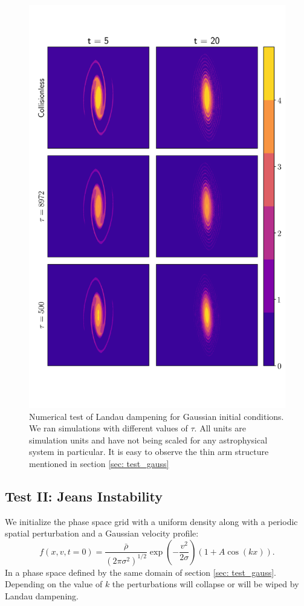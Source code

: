 \documentclass[fleqn,usenatbib]{mnras}
\begin{document}
\begin{figure}
    \centering
    \includegraphics[scale=0.8]{images/gauss.png} %
    \caption{Numerical test of Landau dampening for Gaussian initial conditions. We ran simulations with different values of $\tau$. All units are simulation units and have not being scaled for any astrophysical system in particular. It is easy to observe the thin arm structure mentioned in section \ref{sec: test_gauss}}
    \label{fig: Gauss_test}
\end{figure}



\subsection{Test II: Jeans Instability}
We initialize the phase space grid with a uniform density along with a periodic spatial perturbation and a Gaussian velocity profile:
\begin{equation}
f(x,v,t = 0) = \frac{\bar{\rho}}{(2\pi \sigma^2)^{1/2}} \exp(-\frac{v^2}{2 \sigma}) (1 + A\cos(kx)).
\end{equation} 
In a phase space defined by the same domain of section \ref{sec: test_gauss}. Depending on the value of $k$ the perturbations will collapse or will be wiped by Landau dampening.
\end{document}
